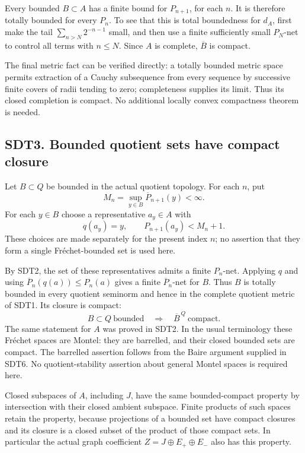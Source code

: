 Every bounded \(B\subset A\) has a finite bound for \(P_{n+1}\), for
each \(n\). It is therefore totally bounded for every \(P_n\). To see
that this is total boundedness for \(d_A\), first make the tail
\(\sum_{n>N}2^{-n-1}\) small, and then use a finite sufficiently small
\(P_N\)-net to control all terms with \(n\le N\). Since \(A\) is
complete, \(\overline B\) is compact.

The final metric fact can be verified directly: a totally bounded metric
space permits extraction of a Cauchy subsequence from every sequence by
successive finite covers of radii tending to zero; completeness supplies
its limit. Thus its closed completion is compact. No additional locally
convex compactness theorem is needed.

\subsection{SDT3. Bounded quotient sets have compact
closure}\label{sdt3.-bounded-quotient-sets-have-compact-closure}

Let \(B\subset Q\) be bounded in the actual quotient topology. For each
\(n\), put \[
M_n=\sup_{y\in B}\overline P_{n+1}(y)<\infty.
\tag{SDT3.1}
\] For each \(y\in B\) choose a representative \(a_y\in A\) with \[
q(a_y)=y,\qquad P_{n+1}(a_y)<M_n+1.
\tag{SDT3.2}
\] These choices are made separately for the present index \(n\); no
assertion that they form a single Fréchet-bounded set is used here.

By SDT2, the set of these representatives admits a finite \(P_n\)-net.
Applying \(q\) and using \(\overline P_n(q(a))\le P_n(a)\) gives a
finite \(\overline P_n\)-net for \(B\). Thus \(B\) is totally bounded in
every quotient seminorm and hence in the complete quotient metric of
SDT1. Its closure is compact: \[
\boxed{B\subset Q\ \text{bounded}\quad\Longrightarrow\quad
\overline B^{\,Q}\ \text{compact}.}
\tag{SDT3.3}
\] The same statement for \(A\) was proved in SDT2. In the usual
terminology these Fréchet spaces are Montel: they are barrelled, and
their closed bounded sets are compact. The barrelled assertion follows
from the Baire argument supplied in SDT6. No quotient-stability
assertion about general Montel spaces is required here.

Closed subspaces of \(A\), including \(J\), have the same
bounded-compact property by intersection with their closed ambient
subspace. Finite products of such spaces retain the property, because
projections of a bounded set have compact closures and its closure is a
closed subset of the product of those compact sets. In particular the
actual graph coefficient \(Z=J\oplus E_+\oplus E_-\) also has this
property.

